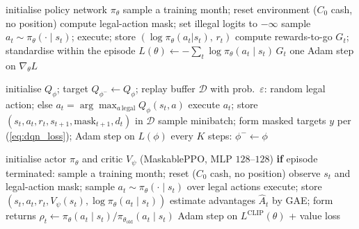 \begin{algorithm}[h]
\caption{REINFORCE for the trading MDP (as implemented)}
\label{alg:reinforce}
\begin{algorithmic}[1]
\State initialise policy network $\pi_\theta$
  \State sample a training month; reset environment ($C_0$ cash, no position)
    \State compute legal-action mask; set illegal logits to $-\infty$
    \State sample $a_t \sim \pi_\theta(\cdot \mid s_t)$; execute; store $(\log\pi_\theta(a_t|s_t),\, r_t)$
  \EndFor
  \State compute rewards-to-go $G_t$; standardise within the episode
  \State $L(\theta) \gets -\sum_t \log \pi_\theta(a_t \mid s_t)\, G_t$
  \State one Adam step on $\nabla_\theta L$
\EndFor
\end{algorithmic}
\end{algorithm}

\begin{algorithm}[h]
\caption{Deep Q-learning for the trading MDP (as implemented)}
\label{alg:dqn}
\begin{algorithmic}[1]
\State initialise $Q_\phi$; target $Q_{\phi^-} \gets Q_\phi$; replay buffer $\mathcal{D}$
  \State with prob.\ $\varepsilon$: random legal action; else $a_t = \arg\max_{a\,\mathrm{legal}} Q_\phi(s_t,a)$
  \State execute $a_t$; store $(s_t, a_t, r_t, s_{t+1}, \mathrm{mask}_{t+1}, d_t)$ in $\mathcal{D}$
  \State sample minibatch; form masked targets $y$ per (\ref{eq:dqn_loss}); Adam step on $L(\phi)$
  \State every $K$ steps: $\phi^- \gets \phi$
\EndFor
\end{algorithmic}
\end{algorithm}

\begin{algorithm}[h]
\caption{MaskablePPO for the trading MDP (as implemented)}
\label{alg:ppo}
\begin{algorithmic}[1]
\State initialise actor $\pi_\theta$ and critic $V_\psi$ (MaskablePPO, MLP $128$--$128$)
    \State \textbf{if} episode terminated: sample a training month; reset ($C_0$ cash, no position)
    \State observe $s_t$ and legal-action mask; sample $a_t \sim \pi_\theta(\cdot \mid s_t)$ over legal actions
    \State execute; store $(s_t, a_t, r_t, V_\psi(s_t), \log\pi_\theta(a_t\mid s_t))$
  \EndFor
  \State estimate advantages $\hat{A}_t$ by GAE; form returns
      \State $\rho_t \gets \pi_\theta(a_t\mid s_t)/\pi_{\theta_{\mathrm{old}}}(a_t\mid s_t)$
      \State Adam step on $L^{\mathrm{CLIP}}(\theta)$ + value loss
    \EndFor
  \EndFor
\EndFor
\end{algorithmic}
\end{algorithm}

